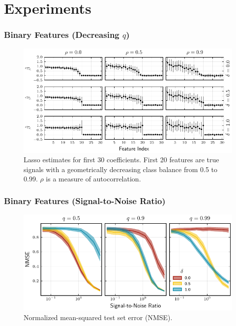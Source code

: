 \documentclass[aspectratio=1610,onlytextwidth]{beamer}
\begin{document}
\section{Experiments}

\begin{frame}[c]
  \frametitle{Binary Features (Decreasing \(q\))}

  \begin{figure}[htpb]
    \centering
    \includegraphics{figures/binary_decreasing.pdf}
    \caption{%
      Lasso estimates for first 30 coefficients. First 20 features are true signals with a geometrically decreasing class balance from 0.5 to 0.99. \(\rho\) is
      a measure of autocorrelation.
    }
  \end{figure}
\end{frame}

\begin{frame}[c]
  \frametitle{Binary Features (Signal-to-Noise Ratio)}

  \begin{figure}[htpb]
    \centering
    \includegraphics{figures/binary_data_sim.pdf}
    \caption{%
      Normalized mean-squared test set error (NMSE).
    }
  \end{figure}
\end{frame}
\end{document}
